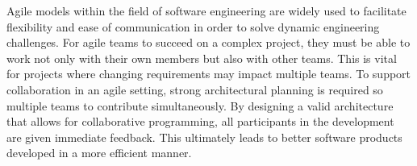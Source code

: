 Agile models within the field of software engineering are widely used to facilitate flexibility and ease of communication in order to solve dynamic engineering challenges.
For agile teams to succeed on a complex project, they must be able to work not only with their own members but also with other teams.
This is vital for projects where changing requirements may impact multiple teams.
To support collaboration in an agile setting, strong architectural planning is required so multiple teams to contribute simultaneously.
By designing a valid architecture that allows for collaborative programming, all participants in the development are given immediate feedback.
This ultimately leads to better software products developed in a more efficient manner.
